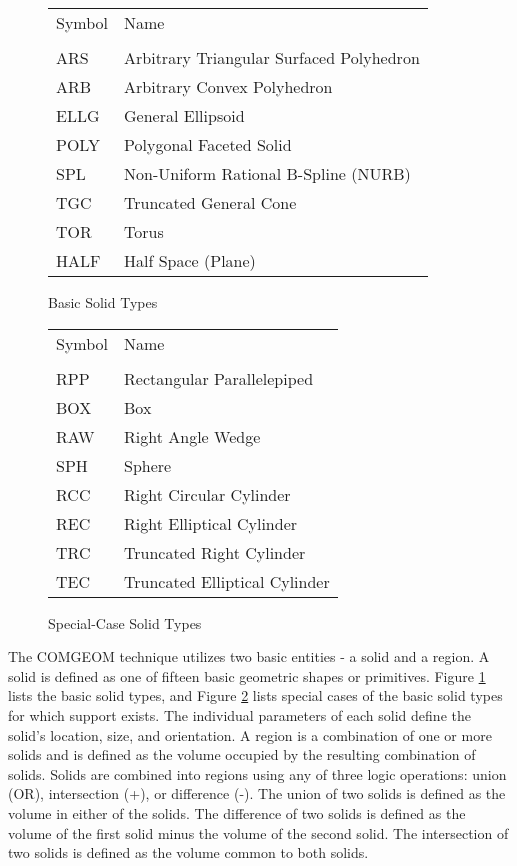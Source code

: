 \begin{figure}[tb]
\begin{tabular}{l l}
Symbol & Name \\
\\
ARS	& Arbitrary Triangular Surfaced Polyhedron \\
ARB	& Arbitrary Convex Polyhedron \\
ELLG	& General Ellipsoid \\
POLY	& Polygonal Faceted Solid \\
SPL	& Non-Uniform Rational B-Spline (NURB) \\
TGC	& Truncated General Cone \\
TOR	& Torus \\
HALF	& Half Space (Plane)
\end{tabular}
\caption{Basic Solid Types \label{list-of-basic-solids} }
\end{figure}
\begin{figure}[tb]
\begin{tabular}{l l}
Symbol & Name \\
\\
RPP	& Rectangular Parallelepiped \\
BOX	& Box \\
RAW	& Right Angle Wedge \\
SPH	& Sphere \\
RCC	& Right Circular Cylinder \\
REC	& Right Elliptical Cylinder \\
TRC	& Truncated Right Cylinder \\
TEC	& Truncated Elliptical Cylinder \\
\end{tabular}
\caption{Special-Case Solid Types \label{list-of-special-case-solids} }
\end{figure}
The COMGEOM technique utilizes two basic entities - a solid and a region.
A solid is defined as one of fifteen basic geometric shapes or
primitives.  Figure \ref{list-of-basic-solids} lists the
basic solid types, and Figure \ref{list-of-special-case-solids}
lists special cases of the basic solid types for which support exists.
The individual parameters of each solid define the solid's
location, size, and orientation.  A region is a combination of
one or more solids and is defined as the volume occupied
by the resulting combination of solids.
Solids are combined into regions using any of three logic
operations: union (OR), intersection (+), or difference (-).
The union of two solids is defined as the volume in either
of the solids.
The difference of two solids is defined as the volume of the first
solid minus the volume of the second solid.
The intersection of two solids is defined as the volume
common to both solids.

